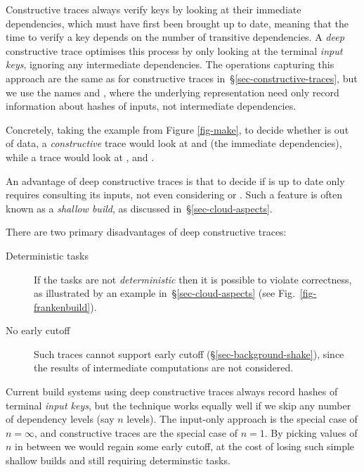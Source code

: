 Constructive traces always verify keys by looking at their immediate
dependencies, which must have first been brought up to date, meaning that the
time to verify a key depends on the number of transitive dependencies. A
\emph{deep} constructive trace optimises this process by only looking at the
terminal \emph{input keys}, ignoring any intermediate dependencies. The operations
capturing this approach are the same as for constructive traces
in~\S\ref{sec-constructive-traces}, but we use the names  and
, where the underlying  representation need only record
information about hashes of inputs, not intermediate dependencies.

Concretely, taking the example from Figure \ref{fig-make}, to decide whether 
is out of data, a \emph{constructive} trace would look at  and 
(the immediate dependencies), while a  trace would look at ,
 and .

An advantage of deep constructive traces is that to decide if  is up to date only
requires consulting its inputs, not even considering  or .
Such a feature is often known as a \emph{shallow build}, as discussed in~\S\ref{sec-cloud-aspects}.

There are two primary disadvantages of deep constructive traces:

\begin{description}
\item[Deterministic tasks] If the tasks are not \emph{deterministic} then it is possible to
violate correctness, as illustrated by an example in~\S\ref{sec-cloud-aspects}
(see Fig.~\ref{fig-frankenbuild}).
\item[No early cutoff] Such traces cannot support early cutoff
(\S\ref{sec-background-shake}), since the results of intermediate computations are not considered.
\end{description}

Current build systems using deep constructive traces always record hashes of
terminal \emph{input keys}, but the technique works equally well if we skip any
number of dependency levels (say $n$ levels). The input-only approach is the
special case of $n = \infty$, and constructive traces are the special case of
$n = 1$. By picking values of $n$ in between we would regain some early cutoff, at the
cost of losing such simple shallow builds and still requiring determinstic tasks.
